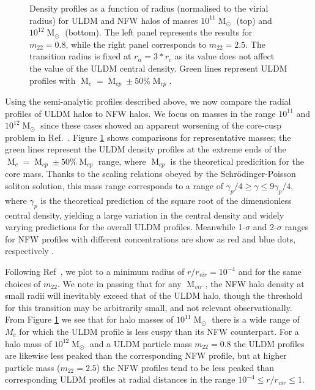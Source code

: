 \documentclass[a4paper,11pt]{article}
\begin{document}
\begin{figure}
\begin{tabular}{cc}
\end{tabular}
\caption{Density profiles as a function of radius (normalised to the virial radius) for ULDM and NFW halos of masses $10^{11}\operatorname{M}_{\odot}$ (top) and $10^{12}\operatorname{M}_{\odot}$ (bottom). The left panel represents the results for $m_{22} = 0.8$, while the right panel corresponds to $m_{22}=2.5$. The transition radius is fixed at $r_{\alpha} = 3*r_c$ as its value does not affect the value of the ULDM central density. Green lines represent  ULDM profiles with $\operatorname{M}_c = \operatorname{M}_{cp} \pm 50 \% \operatorname{M}_{cp}$.}\label{fig:profiles}
\end{figure}

 
Using the semi-analytic profiles described above, we now compare the radial profiles of ULDM halos to NFW halos. We focus on masses in the range $10^{11}$ and $10^{12} \operatorname{M}_{\odot}$ since these cases showed an apparent worsening of the core-cusp problem in Ref.~\cite{Robles:2018fur}. Figure \ref{fig:profiles} shows comparisons for representative masses; the green lines represent the ULDM density profiles at the extreme ends of the $\operatorname{M}_c = \operatorname{M}_{cp} \pm 50 \% \operatorname{M}_{cp}$ range, where $\operatorname{M}_{cp}$ is the theoretical predicition for the core mass. Thanks to the scaling relations obeyed by the Schr{\"o}dinger-Poisson soliton solution, this mass range corresponds to a range of $ \gamma_p /4 \geq \gamma \leq 9\gamma_p/4$, where $\gamma_p$ is the theoretical prediction of the square root of the dimensionless central density, yielding a large variation in the central density and widely varying predictions for the overall ULDM profiles. Meanwhile  1-$\sigma$ and 2-$\sigma$ ranges for NFW profiles with different concentrations are show as red and blue dots, respectively \cite{Maccio:2008pcd}. 

Following Ref~\cite{Robles:2018fur}, we plot to a minimum radius of $r/r_{vir} = 10^{-4}$ and for the same choices of $m_{22}$. We note in passing that for any $\operatorname{M}_{vir}$, the NFW halo density at small radii will inevitably exceed that of the ULDM halo, though the threshold for this transition may be arbitrarily small, and not relevant observationally.  From Figure \ref{fig:profiles} we see that for halo masses of $10^{11}\operatorname{M}_{\odot}$ there is a wide range of $M_c$ for which the ULDM profile is less cuspy than its NFW counterpart.  For a halo mass of $10^{12}\operatorname{M}_{\odot}$ and a ULDM particle mass $m_{22}=0.8$ the ULDM profiles are likewise less peaked than the corresponding NFW profile, but at higher particle mass ($m_{22}=2.5$) the  NFW profiles tend to be less peaked than corresponding ULDM profiles at radial distances in  the range $10^{-4}\leq r/r_{vir} \leq 1$.
\end{document}
